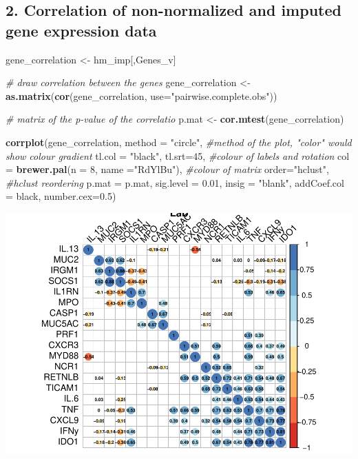 \documentclass[
]{article}
\newenvironment{Shaded}{\begin{snugshade}}{\end{snugshade}}
\newcommand{\AttributeTok}[1]{\textcolor[rgb]{0.13,0.29,0.53}{#1}}
\newcommand{\CommentTok}[1]{\textcolor[rgb]{0.56,0.35,0.01}{\textit{#1}}}
\newcommand{\DecValTok}[1]{\textcolor[rgb]{0.00,0.00,0.81}{#1}}
\newcommand{\FloatTok}[1]{\textcolor[rgb]{0.00,0.00,0.81}{#1}}
\newcommand{\FunctionTok}[1]{\textcolor[rgb]{0.13,0.29,0.53}{\textbf{#1}}}
\newcommand{\NormalTok}[1]{#1}
\newcommand{\OtherTok}[1]{\textcolor[rgb]{0.56,0.35,0.01}{#1}}
\newcommand{\StringTok}[1]{\textcolor[rgb]{0.31,0.60,0.02}{#1}}
\begin{document}
\hypertarget{correlation-of-non-normalized-and-imputed-gene-expression-data}{%
\subsection{2. Correlation of non-normalized and imputed gene expression
data}\label{correlation-of-non-normalized-and-imputed-gene-expression-data}}

\begin{Shaded}
\begin{Highlighting}[]
\NormalTok{gene\_correlation }\OtherTok{\textless{}{-}}\NormalTok{ hm\_imp[,Genes\_v]}

\CommentTok{\# draw correlation between the genes}
\NormalTok{gene\_correlation }\OtherTok{\textless{}{-}} \FunctionTok{as.matrix}\NormalTok{(}\FunctionTok{cor}\NormalTok{(gene\_correlation, }
                                  \AttributeTok{use=}\StringTok{"pairwise.complete.obs"}\NormalTok{))}

\CommentTok{\# matrix of the p{-}value of the correlatio}
\NormalTok{p.mat }\OtherTok{\textless{}{-}} \FunctionTok{cor.mtest}\NormalTok{(gene\_correlation)}

\FunctionTok{corrplot}\NormalTok{(gene\_correlation, }
         \AttributeTok{method =} \StringTok{"circle"}\NormalTok{,  }\CommentTok{\#method of the plot, "color" would show colour gradient}
         \AttributeTok{tl.col =} \StringTok{"black"}\NormalTok{, }\AttributeTok{tl.srt=}\DecValTok{45}\NormalTok{, }\CommentTok{\#colour of labels and rotation}
         \AttributeTok{col =} \FunctionTok{brewer.pal}\NormalTok{(}\AttributeTok{n =} \DecValTok{8}\NormalTok{, }\AttributeTok{name =}\StringTok{"RdYlBu"}\NormalTok{), }\CommentTok{\#colour of matrix}
         \AttributeTok{order=}\StringTok{"hclust"}\NormalTok{, }\CommentTok{\#hclust reordering}
         \AttributeTok{p.mat =}\NormalTok{ p.mat, }\AttributeTok{sig.level =} \FloatTok{0.01}\NormalTok{, }\AttributeTok{insig =} \StringTok{"blank"}\NormalTok{,}
         \AttributeTok{addCoef.col =} \StringTok{\textquotesingle{}black\textquotesingle{}}\NormalTok{,}
         \AttributeTok{number.cex=}\FloatTok{0.5}\NormalTok{) }
\end{Highlighting}
\end{Shaded}

\includegraphics{Testing_normalization_imputation_order_files/figure-latex/unnamed-chunk-6-1.pdf}
\end{document}
